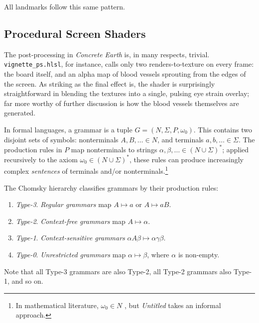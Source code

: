 \documentclass[a4paper, 11pt]{article}
\begin{document}
\begin{flushleft}
\vspace{5pt}\noindent
All landmarks follow this same pattern.

\vspace{5pt}

\subsection{Procedural Screen Shaders}\label{Procedural Screen Shaders} %

The post-processing in \textit{Concrete Earth} is, in many respects, trivial. \texttt{vignette\_ps.hlsl}, for instance, calls only two renders-to-texture on every frame: the board itself, and an alpha map of blood vessels sprouting from the edges of the screen. As striking as the final effect is, the shader is surprisingly straightforward in blending the textures into a single, pulsing eye strain overlay; far more worthy of further discussion is how the blood vessels themselves are generated.

\newpage\noindent
In formal languages, a grammar is a tuple $G = (N,\Sigma,P,\omega_0)$. This contains two disjoint sets of symbols: nonterminals $A, B, \dots \in N$, and terminals $a, b, \dots \in \Sigma$. The production rules in $P$ map nonterminals to strings $\alpha, \beta, \dots \in (N\cup\Sigma)^*$; applied recursively to the axiom $\omega_0 \in (N\cup\Sigma)^*$, these rules can produce increasingly complex \textit{sentences} of terminals and/or nonterminals.\footnote{In mathematical literature, $
\omega_0 \in N$ \citep*{hopcroftFormalLanguages}, but \textit{Untitled} takes an informal approach.}

\vspace{5pt}\noindent
The Chomsky hierarchy \citep{chomskyHierarchy} %
classifies grammars by their production rules:
\begin{enumerate}[label=,itemsep=0em]
\item \textit{Type-3}. \textit{Regular grammars} map $A \mapsto a$ or $A \mapsto aB$.
\item \textit{Type-2}. \textit{Context-free grammars} map $A \mapsto \alpha$.
\item \textit{Type-1}. \textit{Context-sensitive grammars} $\alpha A\beta \mapsto \alpha\gamma\beta$.
\item \textit{Type-0}. \textit{Unrestricted grammars} map $\alpha \mapsto \beta$, where $\alpha$ is non-empty.
\end{enumerate}
Note that all Type-3 grammars are also Type-2, all Type-2 grammars also Type-1, and so on.


\end{flushleft}
\end{document}
